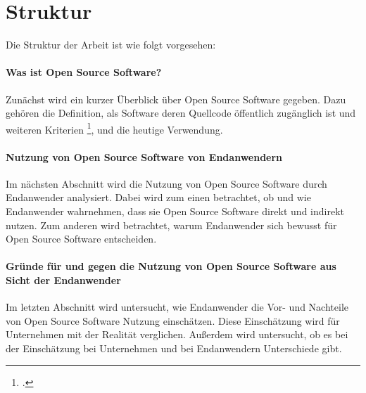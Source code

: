 \documentclass[a4paper]{article}
\begin{document}
	   
	\section{Struktur}
		Die Struktur der Arbeit ist wie folgt vorgesehen:

		\paragraph{Was ist Open Source Software?}
			Zunächst wird ein kurzer Überblick über Open Source Software gegeben. Dazu gehören die Definition, als Software deren Quellcode öffentlich zugänglich ist und weiteren Kriterien \footcite{BAHAMDAIN2015459}, und die heutige Verwendung.
		
		\paragraph{Nutzung von Open Source Software von Endanwendern}
			Im nächsten Abschnitt wird die Nutzung von Open Source Software durch Endanwender analysiert. Dabei wird zum einen betrachtet, ob und wie Endanwender wahrnehmen, dass sie Open Source Software direkt und indirekt nutzen.
			Zum anderen wird betrachtet, warum Endanwender sich bewusst für Open Source Software entscheiden.
		
		\paragraph{Gründe für und gegen die Nutzung von Open Source Software aus Sicht der Endanwender}
			Im letzten Abschnitt wird untersucht, wie Endanwender die Vor- und Nachteile von Open Source Software Nutzung einschätzen.
			Diese Einschätzung wird für Unternehmen mit der Realität verglichen.
			Außerdem wird untersucht, ob es bei der Einschätzung bei Unternehmen und bei Endanwendern Unterschiede gibt.
	
    \clearpage
    \nocite{*}
    \printbibliography
\end{document}
